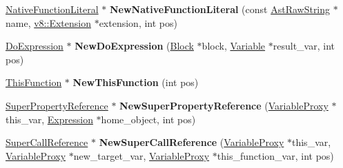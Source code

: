 \begin{DoxyCompactItemize}
\item 
\hyperlink{classv8_1_1internal_1_1_native_function_literal}{Native\+Function\+Literal} $\ast$ {\bfseries New\+Native\+Function\+Literal} (const \hyperlink{classv8_1_1internal_1_1_ast_raw_string}{Ast\+Raw\+String} $\ast$name, \hyperlink{classv8_1_1_extension}{v8\+::\+Extension} $\ast$extension, int pos)\hypertarget{classv8_1_1internal_1_1_b_a_s_e___e_m_b_e_d_d_e_d_abd0b56304c6688cc67bdb998edc10415}{}\label{classv8_1_1internal_1_1_b_a_s_e___e_m_b_e_d_d_e_d_abd0b56304c6688cc67bdb998edc10415}

\item 
\hyperlink{classv8_1_1internal_1_1_do_expression}{Do\+Expression} $\ast$ {\bfseries New\+Do\+Expression} (\hyperlink{classv8_1_1internal_1_1_block}{Block} $\ast$block, \hyperlink{classv8_1_1internal_1_1_variable}{Variable} $\ast$result\+\_\+var, int pos)\hypertarget{classv8_1_1internal_1_1_b_a_s_e___e_m_b_e_d_d_e_d_a01945e3f46d5552d7c87bb90aa259a3f}{}\label{classv8_1_1internal_1_1_b_a_s_e___e_m_b_e_d_d_e_d_a01945e3f46d5552d7c87bb90aa259a3f}

\item 
\hyperlink{classv8_1_1internal_1_1_this_function}{This\+Function} $\ast$ {\bfseries New\+This\+Function} (int pos)\hypertarget{classv8_1_1internal_1_1_b_a_s_e___e_m_b_e_d_d_e_d_ad63483830a0052dffc1895a733189330}{}\label{classv8_1_1internal_1_1_b_a_s_e___e_m_b_e_d_d_e_d_ad63483830a0052dffc1895a733189330}

\item 
\hyperlink{classv8_1_1internal_1_1_super_property_reference}{Super\+Property\+Reference} $\ast$ {\bfseries New\+Super\+Property\+Reference} (\hyperlink{classv8_1_1internal_1_1_variable_proxy}{Variable\+Proxy} $\ast$this\+\_\+var, \hyperlink{classv8_1_1internal_1_1_expression}{Expression} $\ast$home\+\_\+object, int pos)\hypertarget{classv8_1_1internal_1_1_b_a_s_e___e_m_b_e_d_d_e_d_a065b19508d195729c983b2f8474a35df}{}\label{classv8_1_1internal_1_1_b_a_s_e___e_m_b_e_d_d_e_d_a065b19508d195729c983b2f8474a35df}

\item 
\hyperlink{classv8_1_1internal_1_1_super_call_reference}{Super\+Call\+Reference} $\ast$ {\bfseries New\+Super\+Call\+Reference} (\hyperlink{classv8_1_1internal_1_1_variable_proxy}{Variable\+Proxy} $\ast$this\+\_\+var, \hyperlink{classv8_1_1internal_1_1_variable_proxy}{Variable\+Proxy} $\ast$new\+\_\+target\+\_\+var, \hyperlink{classv8_1_1internal_1_1_variable_proxy}{Variable\+Proxy} $\ast$this\+\_\+function\+\_\+var, int pos)\hypertarget{classv8_1_1internal_1_1_b_a_s_e___e_m_b_e_d_d_e_d_a535b855f94cfac9c5f713fc35e2a7986}{}\label{classv8_1_1internal_1_1_b_a_s_e___e_m_b_e_d_d_e_d_a535b855f94cfac9c5f713fc35e2a7986}


\end{DoxyCompactItemize}
